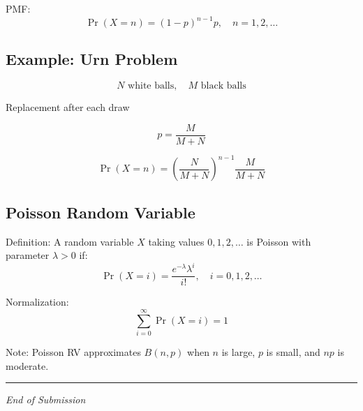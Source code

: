 \documentclass[11pt]{article}
\begin{document}
PMF:
\[
\Pr(X=n) = (1-p)^{n-1}p, \quad n = 1,2,\ldots
\]

\subsection{Example: Urn Problem}

\[
N \text{ white balls}, \quad M \text{ black balls}
\]

Replacement after each draw

\[
p = \frac{M}{M+N}
\]

\[
\Pr(X=n) = \left(\frac{N}{M+N}\right)^{n-1} \frac{M}{M+N}
\]

\subsection{Poisson Random Variable}

Definition: A random variable $X$ taking values $0,1,2,\ldots$ is Poisson with parameter $\lambda > 0$ if:
\[
\Pr(X=i) = \frac{e^{-\lambda}\lambda^i}{i!}, \quad i = 0,1,2,\ldots
\]

Normalization:
\[
\sum_{i=0}^{\infty} \Pr(X=i) = 1
\]

Note: Poisson RV approximates $B(n,p)$ when $n$ is large, $p$ is small, and $np$ is moderate.

\bigskip
\hrule
\vspace{0.2cm}
\begin{center}
    \small \textit{End of Submission}
\end{center}
\end{document}
